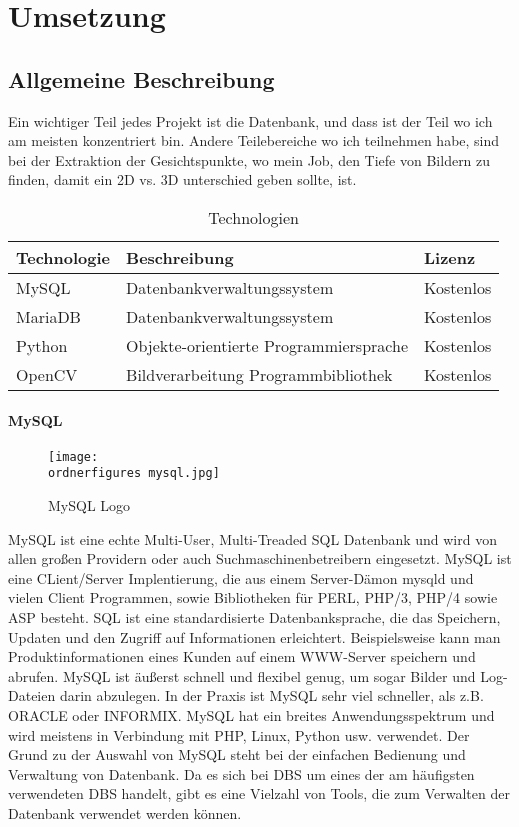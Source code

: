 \chapter{Umsetzung }
\label{\docname}

\section{Allgemeine Beschreibung}
Ein wichtiger Teil jedes Projekt ist die Datenbank, und dass ist der Teil wo ich am meisten konzentriert bin. Andere Teilebereiche wo ich teilnehmen habe, sind bei der Extraktion der Gesichtspunkte, wo mein Job, den Tiefe von Bildern zu finden, damit ein 2D vs. 3D unterschied geben sollte, ist.

\begin{table}[ht]
	\centering
	\begin{tabular}{ |l|l|l| } 
		\hline		
		Technologie & Beschreibung & Lizenz \\ 
		\hline
		MySQL & Datenbankverwaltungssystem & Kostenlos \\ 
		\hline
		MariaDB & Datenbankverwaltungssystem & Kostenlos \\
		\hline 
		Python & Objekte-orientierte Programmiersprache & Kostenlos \\
		\hline 
		OpenCV &  Bildverarbeitung Programmbibliothek  & Kostenlos \\ 
		\hline
	\end{tabular}
	\caption{Technologien}
	\label{table:tech}
\end{table}
\subsubsection{MySQL}
\begin{figure}
	\centering
	\texttt{[image: \\ordnerfigures mysql.jpg]}
	\caption{ MySQL Logo}
	\label{fig:mysql}
	\cite{MySQLlogo}
\end{figure}
MySQL ist eine echte Multi-User, Multi-Treaded SQL Datenbank und wird von allen großen
Providern oder auch Suchmaschinenbetreibern eingesetzt. MySQL ist eine CLient/Server
Implentierung, die aus einem Server-Dämon mysqld und vielen Client Programmen, sowie
Bibliotheken für PERL, PHP/3, PHP/4 sowie ASP besteht.
SQL ist eine standardisierte Datenbanksprache, die das Speichern, Updaten und den Zugriff auf
Informationen erleichtert. Beispielsweise kann man Produktinformationen eines Kunden auf einem
WWW-Server speichern und abrufen. MySQL ist äußerst schnell und flexibel genug, um sogar Bilder
und Log-Dateien darin abzulegen. In der Praxis ist MySQL sehr viel schneller, als z.B. ORACLE oder INFORMIX.\cite{stepken1999mysql}
\bigbreak
MySQL hat ein breites Anwendungsspektrum und wird meistens in Verbindung mit PHP, Linux, Python usw. verwendet. Der Grund zu der Auswahl von MySQL steht bei der einfachen Bedienung und Verwaltung von Datenbank. Da es sich bei DBS um eines der am häufigsten verwendeten DBS handelt, gibt es eine Vielzahl von Tools, die zum Verwalten der Datenbank verwendet werden können.

